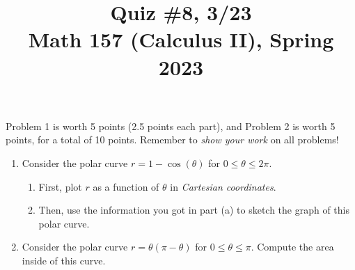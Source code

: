 \documentclass[11pt]{article}
\title{Quiz \#8, 3/23\\ Math 157 (Calculus II), Spring 2023}
\date{}
\begin{document}
\maketitle

\thispagestyle{empty}

\vspace{-2cm}

Problem 1 is worth 5 points (2.5 points each part), and Problem 2 is worth 5 points, for a total of 10 points. Remember to \emph{show your work} on all problems!

\begin{enumerate}
\item Consider the polar curve $r=1-\cos(\theta)$ for $0 \leq \theta \leq 2\pi$.
\begin{enumerate}
\item First, plot $r$ as a function of $\theta$ in \emph{Cartesian coordinates}.
\item Then, use the information you got in part (a) to sketch the graph of this polar curve.
\end{enumerate}

\vspace{3.25in}

\item Consider the polar curve $r=\theta(\pi-\theta)$ for $0 \leq \theta \leq \pi$. Compute the area inside of this curve.

\end{enumerate}
\end{document}
